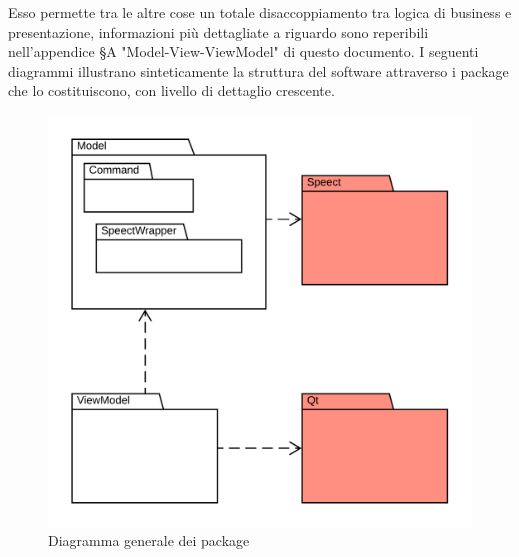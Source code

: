 \documentclass[openany,12pt,a4paper]{report}
\begin{document}
\noindent Esso permette tra le altre cose un totale disaccoppiamento tra logica di business e presentazione, informazioni più dettagliate a riguardo sono reperibili nell'appendice §A "Model-View-ViewModel" di questo documento. I seguenti diagrammi illustrano sinteticamente la struttura del software attraverso i package che lo costituiscono, con livello di dettaglio crescente.
\newpage

\begin{figure}[H]
	\includegraphics[scale=1.4]{PackageDiagram1}
	\centering
	\caption{Diagramma generale dei package}
\end{figure}

\newpage
\end{document}
